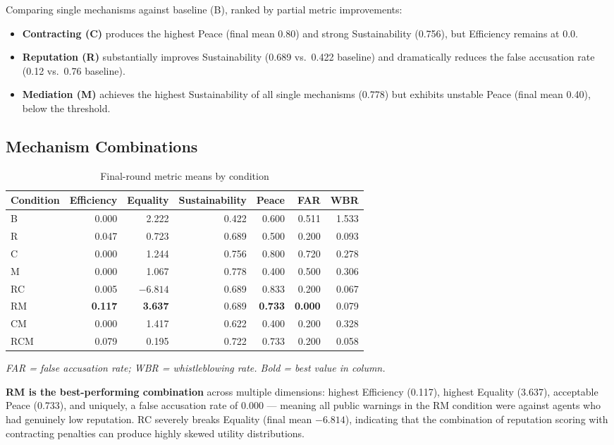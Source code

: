 \documentclass[12pt, a4paper]{article}
\begin{document}
Comparing single mechanisms against baseline (B), ranked by partial metric improvements:

\begin{itemize}
  \item \textbf{Contracting (C)} produces the highest Peace (final mean 0.80) and strong Sustainability (0.756), but Efficiency remains at 0.0.
  \item \textbf{Reputation (R)} substantially improves Sustainability (0.689 vs.\ 0.422 baseline) and dramatically reduces the false accusation rate (0.12 vs.\ 0.76 baseline).
  \item \textbf{Mediation (M)} achieves the highest Sustainability of all single mechanisms (0.778) but exhibits unstable Peace (final mean 0.40), below the threshold.
\end{itemize}

\subsection{Mechanism Combinations}

\begin{table}[H]
\centering
\caption{Final-round metric means by condition}
\label{tab:results}
\begin{tabular}{@{}lrrrrrr@{}}
\toprule
Condition & Efficiency & Equality & Sustainability & Peace & FAR & WBR \\
\midrule
B   & 0.000 & 2.222 & 0.422 & 0.600 & 0.511 & 1.533 \\
R   & 0.047 & 0.723 & 0.689 & 0.500 & 0.200 & 0.093 \\
C   & 0.000 & 1.244 & 0.756 & 0.800 & 0.720 & 0.278 \\
M   & 0.000 & 1.067 & 0.778 & 0.400 & 0.500 & 0.306 \\
RC  & 0.005 & $-6.814$ & 0.689 & 0.833 & 0.200 & 0.067 \\
RM  & \textbf{0.117} & \textbf{3.637} & 0.689 & \textbf{0.733} & \textbf{0.000} & 0.079 \\
CM  & 0.000 & 1.417 & 0.622 & 0.400 & 0.200 & 0.328 \\
RCM & 0.079 & 0.195 & 0.722 & 0.733 & 0.200 & 0.058 \\
\bottomrule
\end{tabular}
\end{table}

\noindent\textit{FAR = false accusation rate; WBR = whistleblowing rate. Bold = best value in column.}

\textbf{RM is the best-performing combination} across multiple dimensions: highest Efficiency (0.117), highest Equality (3.637), acceptable Peace (0.733), and uniquely, a false accusation rate of 0.000 — meaning all public warnings in the RM condition were against agents who had genuinely low reputation. RC severely breaks Equality (final mean $-6.814$), indicating that the combination of reputation scoring with contracting penalties can produce highly skewed utility distributions.
\end{document}

